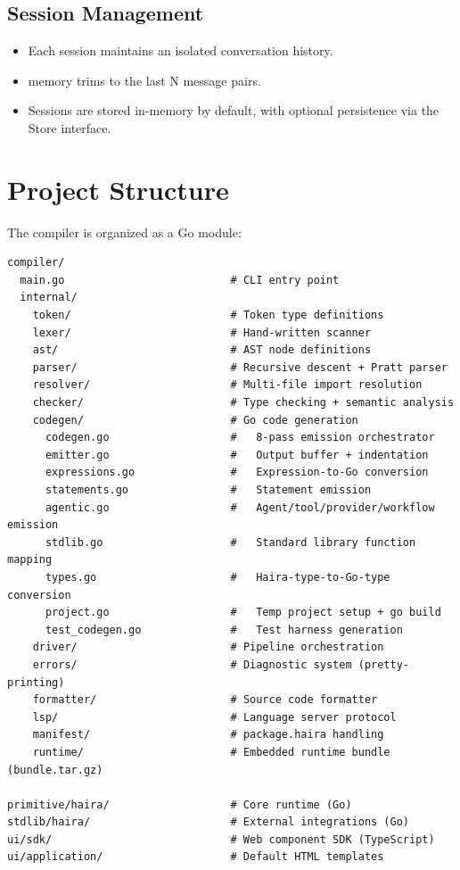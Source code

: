 \subsection{Session Management}

\begin{itemize}
    \item Each session maintains an isolated conversation history.
    \item {} memory trims to the last N message pairs.
    \item Sessions are stored in-memory by default, with optional persistence via the Store interface.
\end{itemize}

\section{Project Structure}

The compiler is organized as a Go module:

\begin{lstlisting}[language={},numbers=none]
compiler/
  main.go                          # CLI entry point
  internal/
    token/                         # Token type definitions
    lexer/                         # Hand-written scanner
    ast/                           # AST node definitions
    parser/                        # Recursive descent + Pratt parser
    resolver/                      # Multi-file import resolution
    checker/                       # Type checking + semantic analysis
    codegen/                       # Go code generation
      codegen.go                   #   8-pass emission orchestrator
      emitter.go                   #   Output buffer + indentation
      expressions.go               #   Expression-to-Go conversion
      statements.go                #   Statement emission
      agentic.go                   #   Agent/tool/provider/workflow emission
      stdlib.go                    #   Standard library function mapping
      types.go                     #   Haira-type-to-Go-type conversion
      project.go                   #   Temp project setup + go build
      test_codegen.go              #   Test harness generation
    driver/                        # Pipeline orchestration
    errors/                        # Diagnostic system (pretty-printing)
    formatter/                     # Source code formatter
    lsp/                           # Language server protocol
    manifest/                      # package.haira handling
    runtime/                       # Embedded runtime bundle (bundle.tar.gz)

primitive/haira/                   # Core runtime (Go)
stdlib/haira/                      # External integrations (Go)
ui/sdk/                            # Web component SDK (TypeScript)
ui/application/                    # Default HTML templates
\end{lstlisting}

